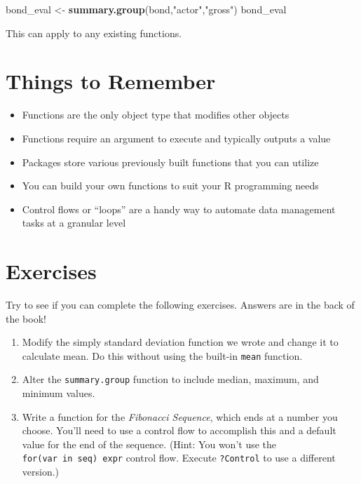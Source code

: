 \documentclass[
]{book}
\newenvironment{Shaded}{\begin{snugshade}}{\end{snugshade}}
\newcommand{\KeywordTok}[1]{\textcolor[rgb]{0.13,0.29,0.53}{\textbf{#1}}}
\newcommand{\NormalTok}[1]{#1}
\newcommand{\StringTok}[1]{\textcolor[rgb]{0.31,0.60,0.02}{#1}}
\providecommand{\tightlist}{%
  \setlength{\itemsep}{0pt}\setlength{\parskip}{0pt}}
\begin{document}
\begin{center}
\begin{Shaded}
\begin{Highlighting}[]
\NormalTok{bond_eval <-}\StringTok{ }\KeywordTok{summary.group}\NormalTok{(bond,}\StringTok{"actor"}\NormalTok{,}\StringTok{"gross"}\NormalTok{)}
\NormalTok{bond_eval}
\end{Highlighting}
\end{Shaded}

This can apply to any existing functions.

\hypertarget{things-to-remember-6}{%
\section{Things to Remember}\label{things-to-remember-6}}

\begin{itemize}
\tightlist
\item
  Functions are the only object type that modifies other objects
\item
  Functions require an argument to execute and typically outputs a value
\item
  Packages store various previously built functions that you can utilize
\item
  You can build your own functions to suit your R programming needs
\item
  Control flows or ``loops'' are a handy way to automate data management tasks at a granular level
\end{itemize}

\hypertarget{exercises-1}{%
\section{Exercises}\label{exercises-1}}

Try to see if you can complete the following exercises. Answers are in the back of the book!

\begin{enumerate}
\def\labelenumi{\arabic{enumi}.}
\tightlist
\item
  Modify the simply standard deviation function we wrote and change it to calculate mean. Do this without using the built-in \texttt{mean} function.
\item
  Alter the \texttt{summary.group} function to include median, maximum, and minimum values.
\item
  Write a function for the \emph{Fibonacci Sequence}, which ends at a number you choose. You'll need to use a control flow to accomplish this and a default value for the end of the sequence. (Hint: You won't use the \texttt{for(var\ in\ seq)\ expr} control flow. Execute \texttt{?Control} to use a different version.)
\end{enumerate}


\end{center}
\end{document}
